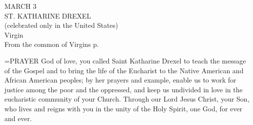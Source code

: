 \begin{center}\normalsize MARCH 3\\
\footnotesize ST. KATHARINE DREXEL\\
\footnotesize (celebrated only in the United States)\\
\footnotesize Virgin\\
\footnotesize From the common of Virgins p. \\
\end{center}

\hangindent=\parindent \small{PRAYER 
God of love,
you called Saint Katharine Drexel
to teach the message of the Gospel
and to bring the life of the Eucharist
to the Native American and African American peoples;
by her prayers and example,
enable us to work for justice
among the poor and the oppressed,
and keep us undivided in love
in the eucharistic community of your Church.
Through our Lord Jesus Christ, your Son,
who lives and reigns with you in the unity of the Holy Spirit,
one God, for ever and ever.\\}
 
